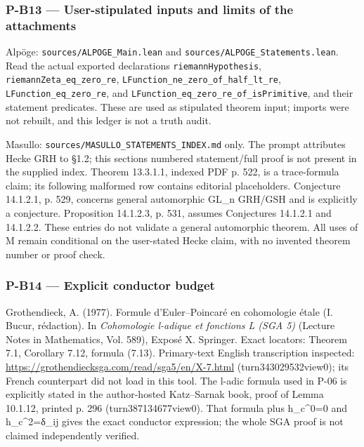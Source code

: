 \documentclass[11pt,a4paper]{article}
\theoremstyle{definition}\newtheorem{definition}{Definition}
\begin{document}
\subsubsection{P-B13 --- User-stipulated inputs and limits of the
attachments}\label{p-b13--user-stipulated-inputs-and-limits-of-the-attachments}

Alpöge: \texttt{sources/ALPOGE\_Main.lean} and
\texttt{sources/ALPOGE\_Statements.lean}. Read the actual exported
declarations \texttt{riemannHypothesis},
\texttt{riemannZeta\_eq\_zero\_re},
\texttt{LFunction\_ne\_zero\_of\_half\_lt\_re},
\texttt{LFunction\_eq\_zero\_re}, and
\texttt{LFunction\_eq\_zero\_re\_of\_isPrimitive}, and their statement
predicates. These are used as stipulated theorem input; imports were not
rebuilt, and this ledger is not a truth audit.

Masullo: \texttt{sources/MASULLO\_STATEMENTS\_INDEX.md} only. The prompt
attributes Hecke GRH to §1.2; this section\textquotesingle s numbered
statement/full proof is not present in the supplied index. Theorem
13.3.1.1, indexed PDF p. 522, is a trace-formula claim; its following
malformed row contains editorial placeholders. Conjecture 14.1.2.1, p.
529, concerns general automorphic GL\_n GRH/GSH and is explicitly a
conjecture. Proposition 14.1.2.3, p. 531, assumes Conjectures 14.1.2.1
and 14.1.2.2. These entries do not validate a general automorphic
theorem. All uses of M remain conditional on the user-stated Hecke
claim, with no invented theorem number or proof check.

\subsubsection{P-B14 --- Explicit conductor
budget}\label{p-b14--explicit-conductor-budget}

Grothendieck, A. (1977). Formule d'Euler--Poincaré en cohomologie étale
(I. Bucur, rédaction). In \emph{Cohomologie l-adique et fonctions L (SGA
5)} (Lecture Notes in Mathematics, Vol. 589), Exposé X. Springer. Exact
locators: Theorem 7.1, Corollary 7.12, formula (7.13). Primary-text
English transcription inspected:
\url{https://grothendiecksga.com/read/sga5/en/X-7.html}
(turn343029532view0); its French counterpart did not load in this tool.
The l-adic formula used in P-06 is explicitly stated in the
author-hosted Katz--Sarnak book, proof of Lemma 10.1.12, printed p. 296
(turn387134677view0). That formula plus h\_c\^{}0=0 and h\_c\^{}2=δ\_ij
gives the exact conductor expression; the whole SGA proof is not claimed
independently verified.
\end{document}

